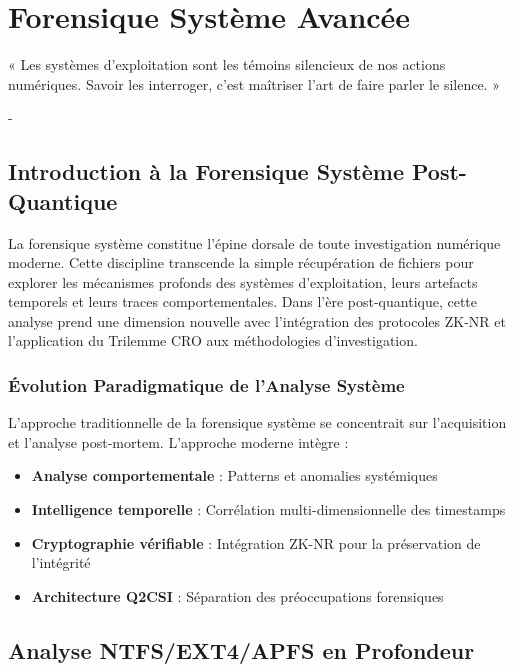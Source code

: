 \chapter{Forensique Système Avancée}

\epigraph{« Les systèmes d'exploitation sont les témoins silencieux de nos actions numériques. Savoir les interroger, c'est maîtriser l'art de faire parler le silence. »}{- \hfill \textit{}}

\section{Introduction à la Forensique Système Post-Quantique}

La forensique système constitue l'épine dorsale de toute investigation numérique moderne. Cette discipline transcende la simple récupération de fichiers pour explorer les mécanismes profonds des systèmes d'exploitation, leurs artefacts temporels et leurs traces comportementales. Dans l'ère post-quantique, cette analyse prend une dimension nouvelle avec l'intégration des protocoles ZK-NR et l'application du Trilemme CRO aux méthodologies d'investigation.

\subsection{Évolution Paradigmatique de l'Analyse Système}

L'approche traditionnelle de la forensique système se concentrait sur l'acquisition et l'analyse post-mortem. L'approche moderne intègre :

\begin{itemize}
\item \textbf{Analyse comportementale} : Patterns et anomalies systémiques
\item \textbf{Intelligence temporelle} : Corrélation multi-dimensionnelle des timestamps
\item \textbf{Cryptographie vérifiable} : Intégration ZK-NR pour la préservation de l'intégrité
\item \textbf{Architecture Q2CSI} : Séparation des préoccupations forensiques
\end{itemize}

\section{Analyse NTFS/EXT4/APFS en Profondeur}

